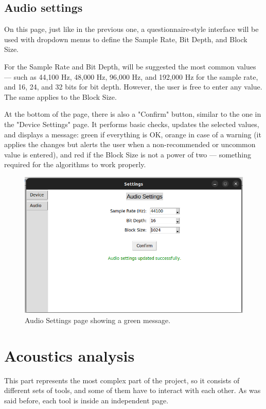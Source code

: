 \subsection{Audio settings}

On this page, just like in the previous one, a questionnaire-style interface will be used with dropdown menus to define the Sample Rate, Bit Depth, and Block Size.

For the Sample Rate and Bit Depth, will be suggested the most common values — such as 44,100 Hz, 48,000 Hz, 96,000 Hz, and 192,000 Hz for the sample rate, and 16, 24, and 32 bits for bit depth. However, the user is free to enter any value. The same applies to the Block Size.

At the bottom of the page, there is also a "Confirm" button, similar to the one in the "Device Settings" page. It performs basic checks, updates the selected values, and displays a message: green if everything is OK, orange in case of a warning (it applies the changes but alerts the user when a non-recommended or uncommon value is entered), and red if the Block Size is not a power of two — something required for the algorithms to work properly.

\begin{figure}[H]
	\centering
	\includegraphics[width=0.8
	\linewidth]{Figures/AudSet.png}
	\caption[Audio setting page]{Audio Settings page showing a green message.}
	\label{fig:Audio Settings}
\end{figure}



\section{Acoustics analysis}

This part represents the most complex part of the project, so it consists of different sets of tools, and some of them have to interact with each other. As was said before, each tool is inside an independent page.

